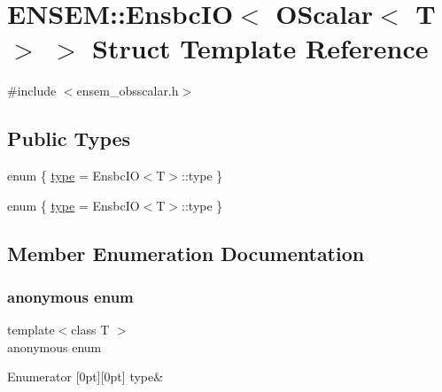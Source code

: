 \hypertarget{structENSEM_1_1EnsbcIO_3_01OScalar_3_01T_01_4_01_4}{}\section{E\+N\+S\+EM\+:\+:Ensbc\+IO$<$ O\+Scalar$<$ T $>$ $>$ Struct Template Reference}
\label{structENSEM_1_1EnsbcIO_3_01OScalar_3_01T_01_4_01_4}


{\ttfamily \#include $<$ensem\+\_\+obsscalar.\+h$>$}

\subsection*{Public Types}
\begin{DoxyCompactItemize}
\item 
enum \{ \mbox{\hyperlink{structENSEM_1_1EnsbcIO_3_01OScalar_3_01T_01_4_01_4_acede6091c60bccec029cd25516a67258a1225eb40e728dd20bf5cc62fdb91e6ad}{type}} = Ensbc\+IO$<$T$>$\+:\+:type
 \}
\item 
enum \{ \mbox{\hyperlink{structENSEM_1_1EnsbcIO_3_01OScalar_3_01T_01_4_01_4_acede6091c60bccec029cd25516a67258a1225eb40e728dd20bf5cc62fdb91e6ad}{type}} = Ensbc\+IO$<$T$>$\+:\+:type
 \}
\end{DoxyCompactItemize}


\subsection{Member Enumeration Documentation}
\mbox{\label{structENSEM_1_1EnsbcIO_3_01OScalar_3_01T_01_4_01_4_a867f0972b39a3b5ee0583c5c2c4f50e0}} 
\subsubsection{\texorpdfstring{anonymous enum}{anonymous enum}}
{\footnotesize\ttfamily template$<$class T $>$ \\
anonymous enum}

\begin{DoxyEnumFields}{Enumerator}
[0pt][0pt]{}\mbox{\label{structENSEM_1_1EnsbcIO_3_01OScalar_3_01T_01_4_01_4_acede6091c60bccec029cd25516a67258a1225eb40e728dd20bf5cc62fdb91e6ad}} 
type&\\
\hline

\end{DoxyEnumFields}
\mbox{\label{structENSEM_1_1EnsbcIO_3_01OScalar_3_01T_01_4_01_4_acede6091c60bccec029cd25516a67258}} 
